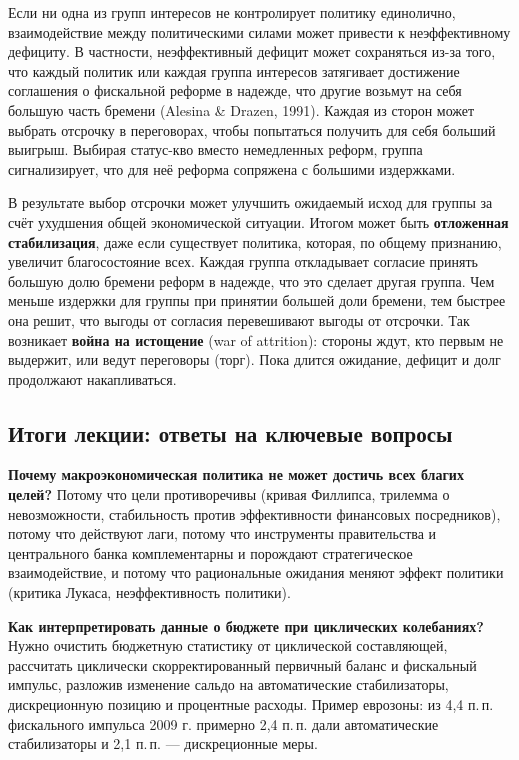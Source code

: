\documentclass[11pt,a4paper]{article}
\begin{document}
Если ни одна из групп интересов не контролирует политику единолично, взаимодействие между политическими силами может привести к неэффективному дефициту. В частности, неэффективный дефицит может сохраняться из-за того, что каждый политик или каждая группа интересов затягивает достижение соглашения о фискальной реформе в надежде, что другие возьмут на себя большую часть бремени (Alesina \& Drazen, 1991). Каждая из сторон может выбрать отсрочку в переговорах, чтобы попытаться получить для себя больший выигрыш. Выбирая статус-кво вместо немедленных реформ, группа сигнализирует, что для неё реформа сопряжена с большими издержками.

В результате выбор отсрочки может улучшить ожидаемый исход для группы за счёт ухудшения общей экономической ситуации. Итогом может быть \textbf{отложенная стабилизация}, даже если существует политика, которая, по общему признанию, увеличит благосостояние всех. Каждая группа откладывает согласие принять большую долю бремени реформ в надежде, что это сделает другая группа. Чем меньше издержки для группы при принятии большей доли бремени, тем быстрее она решит, что выгоды от согласия перевешивают выгоды от отсрочки. Так возникает \textbf{война на истощение} (war of attrition): стороны ждут, кто первым не выдержит, или ведут переговоры (торг). Пока длится ожидание, дефицит и долг продолжают накапливаться.

\subsection{Итоги лекции: ответы на ключевые вопросы}

\textbf{Почему макроэкономическая политика не может достичь всех благих целей?} Потому что цели противоречивы (кривая Филлипса, трилемма о невозможности, стабильность против эффективности финансовых посредников), потому что действуют лаги, потому что инструменты правительства и центрального банка комплементарны и порождают стратегическое взаимодействие, и потому что рациональные ожидания меняют эффект политики (критика Лукаса, неэффективность политики).

\textbf{Как интерпретировать данные о бюджете при циклических колебаниях?} Нужно очистить бюджетную статистику от циклической составляющей, рассчитать циклически скорректированный первичный баланс и фискальный импульс, разложив изменение сальдо на автоматические стабилизаторы, дискреционную позицию и процентные расходы. Пример еврозоны: из 4,4 п.\,п. фискального импульса 2009 г. примерно 2,4 п.\,п. дали автоматические стабилизаторы и 2,1 п.\,п. --- дискреционные меры.
\end{document}

